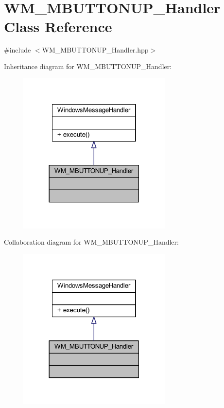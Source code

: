 \hypertarget{class_w_m___m_b_u_t_t_o_n_u_p___handler}{}\section{W\+M\+\_\+\+M\+B\+U\+T\+T\+O\+N\+U\+P\+\_\+\+Handler Class Reference}
\label{class_w_m___m_b_u_t_t_o_n_u_p___handler}


{\ttfamily \#include $<$W\+M\+\_\+\+M\+B\+U\+T\+T\+O\+N\+U\+P\+\_\+\+Handler.\+hpp$>$}



Inheritance diagram for W\+M\+\_\+\+M\+B\+U\+T\+T\+O\+N\+U\+P\+\_\+\+Handler\+:\nopagebreak
\begin{figure}[H]
\begin{center}
\leavevmode
\includegraphics[width=218pt]{class_w_m___m_b_u_t_t_o_n_u_p___handler__inherit__graph}
\end{center}
\end{figure}


Collaboration diagram for W\+M\+\_\+\+M\+B\+U\+T\+T\+O\+N\+U\+P\+\_\+\+Handler\+:\nopagebreak
\begin{figure}[H]
\begin{center}
\leavevmode
\includegraphics[width=218pt]{class_w_m___m_b_u_t_t_o_n_u_p___handler__coll__graph}
\end{center}
\end{figure}
